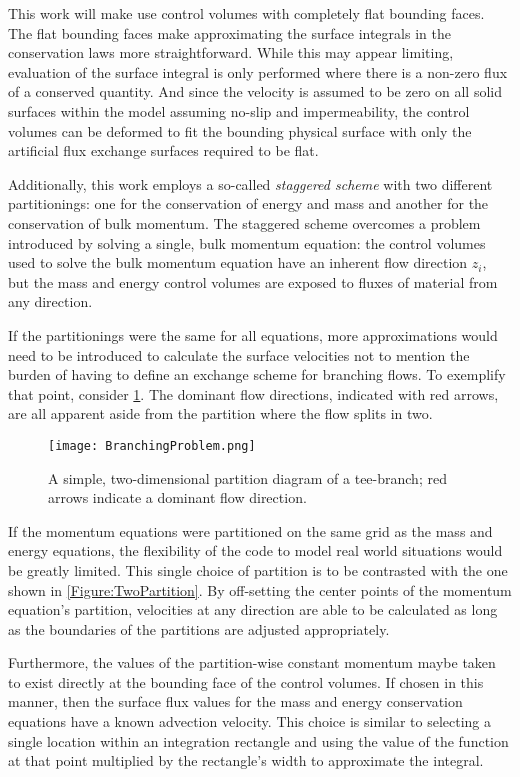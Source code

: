 This work will make use control volumes with completely flat bounding faces.
The flat bounding faces make approximating the surface integrals in the conservation laws more straightforward.
While this may appear limiting, evaluation of the surface integral is only performed where there is a non-zero flux of a conserved quantity.
And since the velocity is assumed to be zero on all solid surfaces within the model assuming no-slip and impermeability, the control volumes can be deformed to fit the bounding physical surface with only the artificial flux exchange surfaces required to be flat.

Additionally, this work employs a so-called \textit{staggered scheme} with two different partitionings: one for the conservation of energy and mass and another for the conservation of bulk momentum.
The staggered scheme overcomes a problem introduced by solving a single, bulk momentum equation: the control volumes used to solve the bulk momentum equation have an inherent flow direction $z_i$, but the mass and energy control volumes are exposed to fluxes of material from any direction.


If the partitionings were the same for all equations, more approximations would need to be introduced to calculate the surface velocities not to mention the burden of having to define an exchange scheme for branching flows.
To exemplify that point, consider \cref{Figure:Branching}.
The dominant flow directions, indicated with red arrows, are all apparent aside from the partition where the flow splits in two.
\begin{figure}[t]%
    \centering
    \caption{A simple, two-dimensional partition diagram of a tee-branch; red arrows indicate a dominant flow direction.}%
    \label{Figure:Branching}%
    \texttt{[image: BranchingProblem.png]}%
\end{figure}
If the momentum equations were partitioned on the same grid as the mass and energy equations, the flexibility of the code to model real world situations would be greatly limited.
This single choice of partition is to be contrasted with the one shown in \cref{Figure:TwoPartition}.
By off-setting the center points of the momentum equation's partition, velocities at any direction are able to be calculated as long as the boundaries of the partitions are adjusted appropriately.

Furthermore, the values of the partition-wise constant momentum maybe taken to exist directly at the bounding face of the control volumes.
If chosen in this manner, then the surface flux values for the mass and energy conservation equations have a known advection velocity.
This choice is similar to selecting a single location within an integration rectangle and using the value of the function at that point multiplied by the rectangle's width to approximate the integral.

